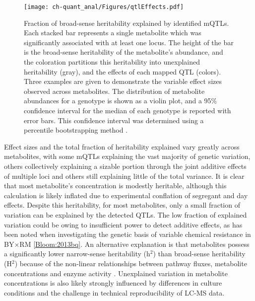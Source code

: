 \begin{figure}[h!]
\begin{center}
\texttt{[image: ch-quant\_anal/Figures/qtlEffects.pdf]}
\caption[Fraction of broad-sense heritability explained by identified mQTLs]{Fraction of broad-sense heritability explained by identified mQTLs.  Each stacked bar represents a single metabolite which was significantly associated with at least one locus.  The height of the bar is the broad-sense heritability of the metabolite's abundance, and the coloration partitions this heritability into unexplained heritability (gray), and the effects of each mapped QTL (colors).  Three examples are given to demonstrate the variable effect sizes observed across metabolites.  The distribution of metabolite abundances for a genotype is shown as a violin plot, and a 95\% confidence interval for the median of each genotype is reported with error bars.  This confidence interval was determined using a percentile bootstrapping method \cite{Davison:1997vn}.}
\label{ch-quant_anal:qtlEffects}
\end{center}
\end{figure}

Effect sizes and the total fraction of heritability explained vary greatly across metabolites, with some mQTLs explaining the vast majority of genetic variation, others collectively explaining a sizable portion through the joint additive effects of multiple loci and others still explaining little of the total variance.  It is clear that most metabolite's concentration is modestly heritable, although this calculation is likely inflated due to experimental conflation of segregant and day effects.  Despite this heritability, for most metabolites, only a small fraction of variation can be explained by the detected QTLs.  The low fraction of explained variation could be owing to insufficient power to detect additive effects, as has been noted when investigating the genetic basis of variable chemical resistance in BY$\times$RM \ref{Bloom:2013bq}.  An alternative explanation is that metabolites possess a significantly lower narrow-sense heritability (h$^{2}$) than broad-sense heritability (H$^{2}$) because of the non-linear relationships between pathway fluxes, metabolite concentrations and enzyme activity \cite{Kacser:1973fe, Rowe:2008ty}. Unexplained variation in metabolite concentrations is also likely strongly influenced by differences in culture conditions and the challenge in technical reproducibility of LC-MS data. 

